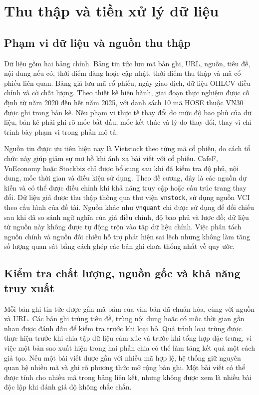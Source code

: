 \documentclass[12pt, a4paper, oneside]{report}
\begin{document}
\section{Thu thập và tiền xử lý dữ liệu}
\label{sec:pp-du-lieu}

\subsection{Phạm vi dữ liệu và nguồn thu thập}

Dữ liệu gồm hai bảng chính. Bảng tin tức lưu mã bản ghi, URL, nguồn, tiêu đề, nội
dung nếu có, thời điểm đăng hoặc cập nhật, thời điểm thu thập và mã cổ phiếu liên
quan. Bảng giá lưu mã cổ phiếu, ngày giao dịch, dữ liệu OHLCV điều chỉnh và cờ chất
lượng. Theo thiết kế hiện hành, giai đoạn thực nghiệm được cố định từ năm 2020 đến hết
năm 2025, với danh sách 10 mã HOSE thuộc VN30 được ghi trong bản kê. Nếu phạm vi thực
tế thay đổi do mức độ bao phủ của dữ liệu, bản kê phải ghi rõ mốc bắt đầu, mốc kết thúc
và lý do thay đổi, thay vì chỉ trình bày phạm vi trong phần mô tả.

Nguồn tin được ưu tiên hiện nay là Vietstock theo từng mã cổ phiếu, do cách tổ chức
này giúp giảm sự mơ hồ khi ánh xạ bài viết với cổ phiếu. CafeF, VnEconomy hoặc
Stockbiz chỉ được bổ sung sau khi đã kiểm tra độ phủ, nội dung, mốc thời gian và điều
kiện sử dụng. Theo đề cương, đây là các nguồn dự kiến và có thể được điều chỉnh khi
khả năng truy cập hoặc cấu trúc trang thay đổi. Dữ liệu giá được thu thập thông qua
thư viện \texttt{vnstock}, sử dụng nguồn VCI theo cấu hình của đề tài. Nguồn khác như
\texttt{vnquant} chỉ được sử dụng để đối chiếu sau khi đã so sánh ngữ nghĩa của giá
điều chỉnh, độ bao phủ và lược đồ; dữ liệu từ nguồn này không được tự động trộn vào
tập dữ liệu chính. Việc phân tách nguồn chính và nguồn đối chiếu hỗ trợ phát hiện sai
lệch nhưng không làm tăng số lượng quan sát bằng cách ghép các bản ghi chưa thống
nhất về quy ước.

\subsection{Kiểm tra chất lượng, nguồn gốc và khả năng truy xuất}

Mỗi bản ghi tin tức được gắn mã băm của văn bản đã chuẩn hóa, cùng với nguồn và URL.
Các bản ghi trùng tiêu đề, trùng nội dung hoặc có mốc thời gian gần nhau được đánh dấu
để kiểm tra trước khi loại bỏ. Quá trình loại trùng được thực hiện trước khi chia tập
dữ liệu cảm xúc và trước khi tổng hợp đặc trưng, vì việc một bản sao xuất hiện trong
hai phần chia có thể làm tăng kết quả một cách giả tạo. Nếu một bài viết được gắn với
nhiều mã hợp lệ, hệ thống giữ nguyên quan hệ nhiều mã và ghi rõ phương thức mở rộng
bản ghi. Một bài viết có thể được tính cho nhiều mã trong bảng liên kết, nhưng không
được xem là nhiều bài độc lập khi đánh giá độ không chắc chắn.
\end{document}
